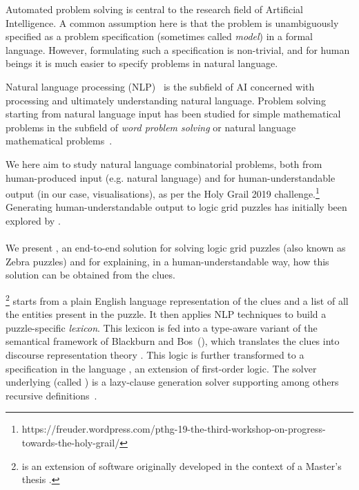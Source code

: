 Automated problem solving is central to the research field of Artificial Intelligence. A common assumption here is that the problem is unambiguously specified as a problem specification (sometimes called \textit{model}) in a formal language. However, formulating such a specification is non-trivial, and for human beings it is much easier to specify problems in natural language.

Natural language processing (NLP)~\cite{manning1999foundations} is the subfield of AI concerned with processing and ultimately understanding natural language. Problem solving starting from natural language input has been studied for simple mathematical problems in the subfield of \textit{word problem solving} or natural language mathematical problems~\cite{Mukherjee2008}.

We here aim to study natural language combinatorial problems, both from human-produced input (e.g. natural language) and for human-understandable output (in our case, visualisations), as per the Holy Grail 2019 challenge.\footnote{https://freuder.wordpress.com/pthg-19-the-third-workshop-on-progress-towards-the-holy-grail/} Generating human-understandable output to logic grid puzzles has initially been explored by \citet{sqalli1996inference}.

\paragraph{}
We present \ourtool,  an end-to-end solution for solving logic grid puzzles (also known as Zebra puzzles) and for explaining, in a human-understandable way, how this solution can be obtained from the clues. 

\ourtool\footnote{\ourtool is an extension of software originally developed in the context of a Master's thesis \cite{msc/Claes17}.} starts from a plain English language representation of the clues and a list of all the entities present in the puzzle. It then applies NLP techniques to build a puzzle-specific \textit{lexicon}. This lexicon is fed into a type-aware variant of the semantical framework of Blackburn and Bos~(\citeyear{Blackburn2005,Blackburn2006}), which translates the clues into discourse representation theory \cite{DRT}. This logic is further transformed to a specification in the \idp language , an extension of first-order logic. The  solver underlying \idp (called \minisatid) is a lazy-clause generation solver supporting among others recursive definitions~.

